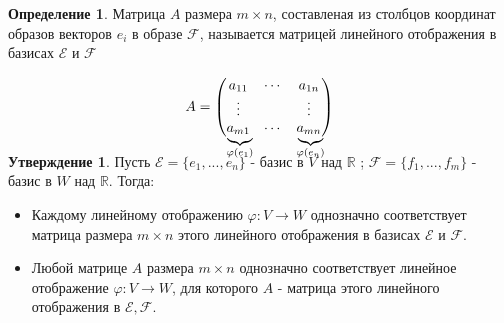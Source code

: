 \documentclass[a4paper, 12pt]{article}
\newcommand{\R}{\mathbb R}
\renewcommand{\phi}{\varphi}
\newcommand\undermat[2]{\makebox[0pt][l]{$\smash{\underbrace
{\phantom{\begin{matrix}#2\end{matrix}}}_{\text{$#1$}}}$}#2}
\theoremstyle{definition}
\newtheorem*{definition}{Определение}
\newtheorem*{subtheorem}{Утверждение}
\begin{document}
  \begin{definition}
    Матрица $A$ размера $m \times n$,  составленая из столбцов координат образов векторов $e_i$ в образе $\mathcal{F}$, называется матрицей линейного отображения в базисах $\mathcal{E} $ и $\mathcal{F}$  
  \end{definition} 
  $$A = \begin{pmatrix}
    a_{11} & \cdots & a_{1n} \\
    \vdots & \null & \vdots \\
    \undermat{\phi(e_1)}{a_{m1}}  & \cdots & \undermat{\phi(e_n)}{a_{mn}} 
  \end{pmatrix}$$  
  \vspace{0.3cm}
  \begin{subtheorem}
    Пусть $\mathcal{E}  = \{e_1,...,e_n\}$ - базис в $V$ над $\R$ ; $\mathcal{F}  = \{f_1,...,f_m\}$ - базис в $W$ над $\R$. Тогда:
    \begin{itemize}
      \item Каждому линейному отображению $\phi: V \to W$ однозначно соответствует матрица размера $m \times n$ этого линейного отображения в базисах $\mathcal{E} \text{ и } \mathcal{F}$.
      \item Любой матрице $A$ размера $m \times n$ однозначно соответствует линейное отображение $\phi: V \to W$, для которого $A$ - матрица этого линейного отображения в $\mathcal{E}, \mathcal{F}$.
    \end{itemize}
  \end{subtheorem} 
\end{document}
